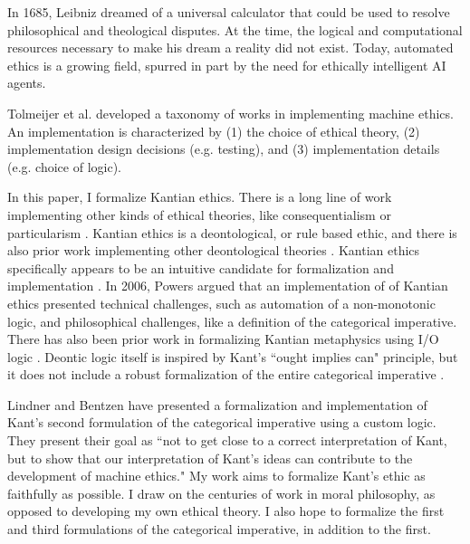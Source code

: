 %
\begin{isabellebody}%
%
%
\isadelimtheory
%
\endisadelimtheory
%
\isatagtheory
%
\endisatagtheory
{\isafoldtheory}%
%
\isadelimtheory
%
\endisadelimtheory
%
\isadelimdocument
%
\endisadelimdocument
%
\isatagdocument
%
\isamarkuptrue%
%
\endisatagdocument
{\isafolddocument}%
%
\isadelimdocument
%
\endisadelimdocument
%
\begin{isamarkuptext}%
In 1685, Leibniz dreamed of a universal calculator that could be used to resolve philosophical 
and theological disputes. At the time, the logical and computational resources necessary to make his 
dream a reality did not exist. Today, automated ethics is a growing field, spurred in part by the need for
ethically intelligent AI agents. 

Tolmeijer et al. \cite{mesurvey} developed a taxonomy of works in implementing machine ethics. An implementation is characterized
by (1) the choice of ethical theory, (2) implementation design decisions (e.g. testing), and (3) implementation
details (e.g. choice of logic).

In this paper, I formalize Kantian ethics. There is a long line of work implementing other 
kinds of ethical theories, like consequentialism \cite{util1, util2} or particularism \cite{particularism1, particularism2}. 
Kantian ethics is a deontological, or rule based ethic, and there is also prior work implementing other
 deontological theories \cite{dde, deon1, deon2}. 
Kantian ethics specifically appears to be an intuitive candidate for formalization and implementation \cite{powers, lin}. In 2006, 
Powers \cite{powers} argued that an implementation of of Kantian ethics presented technical challenges,
 such as automation of a non-monotonic logic, and philosophical challenges, like a definition of the 
categorical imperative. There has also been prior work in formalizing Kantian metaphysics using
 I/O logic \cite{io}. Deontic logic itself is inspired by Kant's ``ought implies can" principle, 
but it does not include a robust formalization of the entire categorical imperative \cite{cresswell}.

Lindner and Bentzen \cite{BL} have presented a formalization and implementation of Kant's second formulation of the categorical 
imperative using a custom logic. They present their goal as ``not to get close to a correct interpretation
 of Kant, but to show that our interpretation of Kant’s ideas can contribute to the development of 
machine ethics." My work aims to formalize Kant's ethic as faithfully as possible. I draw on the 
centuries of work in moral philosophy, as opposed to developing my own ethical theory. I also hope to 
formalize the first and third formulations of the categorical imperative, in addition to the first.


\end{isamarkuptext}
\end{isabellebody}
